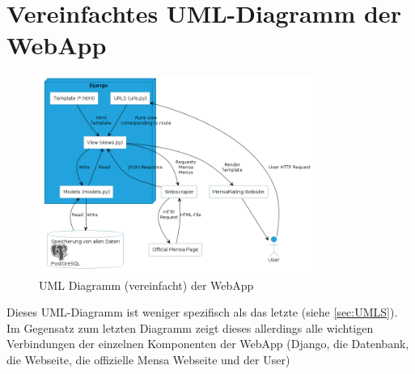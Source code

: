 \section{Vereinfachtes UML-Diagramm der WebApp} \label{sec:UMLG}
\begin{figure}[ht]
    \centering
    \includegraphics[width=0.8\textwidth]{images/UML-General.png}
    \caption{UML Diagramm (vereinfacht) der WebApp}
    \label{fig:DB}
\end{figure}

Dieses UML-Diagramm ist weniger spezifisch als das letzte (siehe
\ref{sec:UMLS}). Im Gegensatz zum letzten Diagramm zeigt dieses allerdings alle
wichtigen Verbindungen der einzelnen Komponenten der WebApp (Django, die
Datenbank, die Webseite, die offizielle Mensa Webseite und der User)


